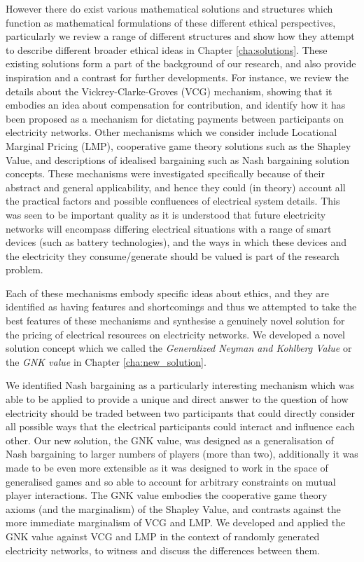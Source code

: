 However there do exist various mathematical solutions and structures which function as mathematical formulations of these different ethical perspectives, particularly we review a range of different structures and show how they attempt to describe different broader ethical ideas in Chapter \ref{cha:solutions}.
These existing solutions form a part of the background of our research, and also provide inspiration and a contrast for further developments.
For instance, we review the details about the Vickrey-Clarke-Groves (VCG) mechanism, showing that it embodies an idea about compensation for contribution, and identify how it has been proposed as a mechanism for dictating payments between participants on electricity networks.
Other mechanisms which we consider include Locational Marginal Pricing (LMP), cooperative game theory solutions such as the Shapley Value, and descriptions of idealised bargaining such as Nash bargaining solution concepts.
These mechanisms were investigated specifically because of their abstract and general applicability, and hence they could (in theory) account all the practical factors and possible confluences of electrical system details.
This was seen to be important quality as it is understood that future electricity networks will encompass differing electrical situations with a range of smart devices (such as battery technologies), and the ways in which these devices and the electricity they consume/generate should be valued is part of the research problem.


Each of these mechanisms embody specific ideas about ethics, and they are identified as having features and shortcomings and thus we attempted to take the best features of these mechanisms and synthesise a genuinely novel solution for the pricing of electrical resources on electricity networks.
We developed a novel solution concept which we called the \textit{Generalized Neyman and Kohlberg Value} or the \textit{GNK value} in Chapter \ref{cha:new_solution}.

We identified Nash bargaining as a particularly interesting mechanism which was able to be applied to provide a unique and direct answer to the question of how electricity should be traded between two participants that could directly consider all possible ways that the electrical participants could interact and influence each other.
Our new solution, the GNK value, was designed as a generalisation of Nash bargaining to larger numbers of players (more than two), additionally it was made to be even more extensible as it was designed to work in the space of generalised games and so able to account for arbitrary constraints on mutual player interactions.
The GNK value embodies the cooperative game theory axioms (and the marginalism) of the Shapley Value, and contrasts against the more immediate marginalism of VCG and LMP.
We developed and applied the GNK value against VCG and LMP in the context of randomly generated electricity networks, to witness and discuss the differences between them.

